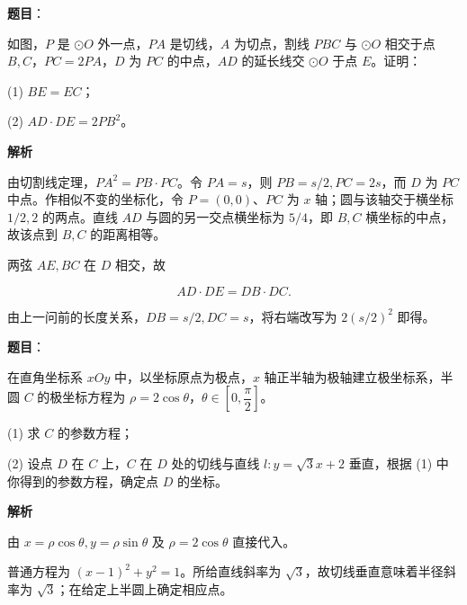 \begin{answer}

\textbf{题目}：

如图，$P$ 是 $\odot O$ 外一点，$PA$ 是切线，$A$ 为切点，割线 $PBC$ 与 $\odot O$ 相交于点 $B,C$，$PC=2PA$，$D$ 为 $PC$ 的中点，$AD$ 的延长线交 $\odot O$ 于点 $E$。证明：
\nopagebreak[4]
\begin{center}\end{center}
\nopagebreak[4]
(1) $BE=EC$；

(2) $AD\cdot DE=2PB^2$。

\textbf{解析}


由切割线定理，$PA^2=PB\cdot PC$。令 $PA=s$，则 $PB=s/2,PC=2s$，而 $D$ 为 $PC$ 中点。作相似不变的坐标化，令 $P=(0,0)$、$PC$ 为 $x$ 轴；圆与该轴交于横坐标 $1/2,2$ 的两点。直线 $AD$ 与圆的另一交点横坐标为 $5/4$，即 $B,C$ 横坐标的中点，故该点到 $B,C$ 的距离相等。


两弦 $AE,BC$ 在 $D$ 相交，故

\nopagebreak[4]
\[
AD\cdot DE=DB\cdot DC.
\]

由上一问前的长度关系，$DB=s/2,DC=s$，将右端改写为 $2(s/2)^2$ 即得。



\end{answer}
\begin{answer}

\textbf{题目}：

在直角坐标系 $xOy$ 中，以坐标原点为极点，$x$ 轴正半轴为极轴建立极坐标系，半圆 $C$ 的极坐标方程为 $\rho=2\cos\theta$，$\theta\in\left[0,\dfrac\pi2\right]$。

(1) 求 $C$ 的参数方程；

(2) 设点 $D$ 在 $C$ 上，$C$ 在 $D$ 处的切线与直线 $l:y=\sqrt3x+2$ 垂直，根据 (1) 中你得到的参数方程，确定点 $D$ 的坐标。

\textbf{解析}


由 $x=\rho\cos\theta,y=\rho\sin\theta$ 及 $\rho=2\cos\theta$ 直接代入。


普通方程为 $(x-1)^2+y^2=1$。所给直线斜率为 $\sqrt3$，故切线垂直意味着半径斜率为 $\sqrt3$；在给定上半圆上确定相应点。



\end{answer}
